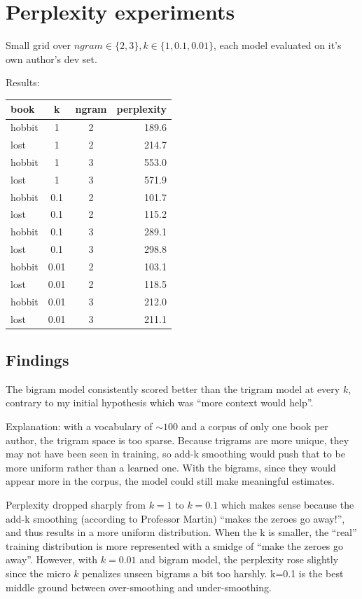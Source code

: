 \documentclass[11pt]{article}
\begin{document}
\section{Perplexity experiments}

Small grid over $ngram \in \{2, 3\}, k \in \{1, 0.1, 0.01\}$, each model evaluated on it's own author's dev set.

Results:

\begin{tabular}{lccr}
  \textbf{book} & \textbf{k} & \textbf{ngram} & \textbf{perplexity} \\
  \hline
  hobbit & 1 & 2 & 189.6 \\
  lost & 1 & 2 & 214.7 \\
  hobbit & 1 & 3 & 553.0 \\
  lost & 1 & 3 & 571.9 \\
  hobbit & 0.1 & 2 & 101.7 \\
  lost & 0.1 & 2 & 115.2 \\
  hobbit & 0.1 & 3 & 289.1 \\
  lost & 0.1 & 3 & 298.8 \\
  hobbit & 0.01 & 2 & 103.1 \\
  lost & 0.01 & 2  & 118.5 \\
  hobbit & 0.01 & 3 & 212.0 \\
  lost & 0.01 & 3 & 211.1
\end{tabular}

\subsection{Findings}

The bigram model consistently scored better than the trigram model at every $k$, contrary to my initial hypothesis which was ``more context would help''.

Explanation: with a vocabulary of $\sim 100$ and a corpus of only one book per author, the trigram space is too sparse. Because trigrams are more unique, they may not have been seen in training, so add-k smoothing would push that to be more uniform rather than a learned one. With the bigrams, since they would appear more in the corpus, the model could still make meaningful estimates.

Perplexity dropped sharply from $k=1$ to $k=0.1$ which makes sense because the add-k smoothing (according to Professor Martin) ``makes the zeroes go away!'', and thus results in a more uniform distribution. When the k is smaller, the ``real'' training distribution is more represented with a smidge of ``make the zeroes go away''. However, with $k=0.01$ and bigram model, the perplexity rose slightly since the micro $k$ penalizes unseen bigrams a bit too harshly. k=0.1 is the best middle ground between over-smoothing and under-smoothing.
\end{document}
